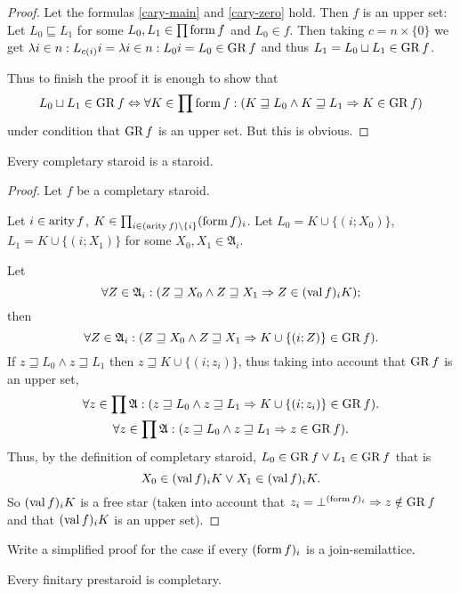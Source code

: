\begin{proof}
Let the formulas \ref{cary-main} and \ref{cary-zero} hold. Then
$f$ is an upper set: Let $L_{0}\sqsubseteq L_{1}$ for some $L_{0},L_{1}\in\prod\operatorname{form} f$
and $L_{0}\in f$. Then taking $c=n\times\{0\}$ we get $\lambda i\in n:L_{c(i)}i=\lambda i\in n:L_{0}i=L_{0}\in\operatorname{GR} f$
and thus $L_{1}=L_{0}\sqcup L_{1}\in\operatorname{GR} f$.

Thus to finish the proof it is enough to show that 
\[
L_{0}\sqcup L_{1}\in\operatorname{GR} f\Leftrightarrow\forall K\in\prod\operatorname{form} f:(K\sqsupseteq L_{0}\wedge K\sqsupseteq L_{1}\Rightarrow K\in\operatorname{GR} f)
\]
under condition that $\operatorname{GR} f$ is an upper set. But this is obvious.\end{proof}
\begin{prop}
Every completary staroid is a staroid.\end{prop}
\begin{proof}
Let $f$ be a completary staroid.

Let $i\in\operatorname{arity} f$, $K\in\prod_{i\in(\operatorname{arity} f)\setminus\{i\}}(\operatorname{form} f)_{i}$.
Let $L_{0}=K\cup\{(i;X_{0})\}$, $L_{1}=K\cup\{(i;X_{1})\}$ for some
$X_{0},X_{1}\in\mathfrak{A}_{i}$.

Let 
\[
\forall Z\in\mathfrak{A}_{i}:(Z\sqsupseteq X_{0}\wedge Z\sqsupseteq X_{1}\Rightarrow Z\in(\operatorname{val} f)_{i}K);
\]
then 
\[
\forall Z\in\mathfrak{A}_{i}:(Z\sqsupseteq X_{0}\wedge Z\sqsupseteq X_{1}\Rightarrow K\cup\{(i;Z)\}\in\operatorname{GR} f).
\]
If $z\sqsupseteq L_{0}\wedge z\sqsupseteq L_{1}$ then $z\sqsupseteq K\cup\{(i;z_{i})\}$,
thus taking into account that $\operatorname{GR} f$ is an upper set,
\begin{gather*}
\forall z\in\prod\mathfrak{A}:(z\sqsupseteq L_{0}\wedge z\sqsupseteq L_{1}\Rightarrow K\cup\{(i;z_{i})\}\in\operatorname{GR} f).\\
\forall z\in\prod\mathfrak{A}:(z\sqsupseteq L_{0}\wedge z\sqsupseteq L_{1}\Rightarrow z\in\operatorname{GR} f).
\end{gather*}
Thus, by the definition of completary staroid, $L_{0}\in\operatorname{GR} f\vee L_{1}\in\operatorname{GR} f$
that is 
\[
X_{0}\in(\operatorname{val} f)_{i}K\vee X_{1}\in(\operatorname{val} f)_{i}K.
\]
So $(\operatorname{val} f)_{i}K$ is a free star (taken into account that $z_{i}=\bot^{(\operatorname{form} f)_{i}}\Rightarrow z\notin\operatorname{GR} f$
and that $(\operatorname{val} f)_{i}K$ is an upper set).\end{proof}
\begin{xca}
Write a simplified proof for the case if every $(\operatorname{form} f)_{i}$ is
a join-semilattice.\end{xca}
\begin{lem}
Every finitary prestaroid is completary.\end{lem}
